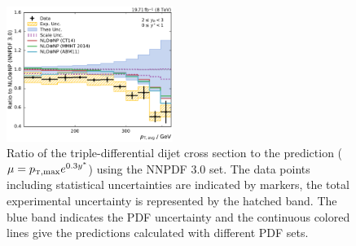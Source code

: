 \begin{figure}[htbp]
    \includegraphics[width=0.48\textwidth]{figures/measurement/ratio_to_NNPDF30+np_totcomp_yb2ys0.pdf}
    \caption[Ratio of measured cross sections to prediction using different PDFs]{
    Ratio of the triple-differential dijet cross section to the \NLOJETPP
    prediction ($\mu=\ptmax e^{0.3 \ystar}$) using the NNPDF 3.0 set. The data
    points including statistical uncertainties are indicated by markers, the total
    experimental uncertainty is represented by the hatched band. The blue
    band indicates the PDF uncertainty and the continuous colored lines give the
    predictions calculated with different PDF sets.}
    \label{fig:ratio_nnpdf30_nlo}
\end{figure}

